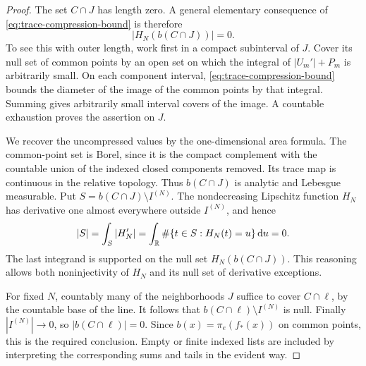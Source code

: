 \begin{proof}
The set $C\cap J$ has length zero.  A general elementary consequence
of \eqref{eq:trace-compression-bound} is therefore
\[
 |H_N(b(C\cap J))|=0.
\]
To see this with outer length, work first in a compact subinterval
of $J$.  Cover its null set of common points by an open set on which
the integral of $|U_m'|+P_m$ is arbitrarily small.  On each component
interval, \eqref{eq:trace-compression-bound} bounds the diameter of
the image of the common points by that integral.  Summing gives
arbitrarily small interval covers of the image.  A countable
exhaustion proves the assertion on $J$.

We recover the uncompressed values by the one-dimensional area
formula.  The common-point set is Borel, since it is the compact
complement with the countable union of the indexed closed components
removed.  Its trace map is continuous in the relative topology.
Thus $b(C\cap J)$ is analytic and Lebesgue measurable.  Put
$S=b(C\cap J)\setminus I^{(N)}$.  The nondecreasing Lipschitz
function $H_N$ has derivative one almost everywhere outside
$I^{(N)}$, and hence
\[
 |S|=\int_S|H_N'|
 =\int_\mathbb R\#\{t\in S:H_N(t)=u\}\,\mathrm d u=0.
\]
The last integrand is supported on the null set
$H_N(b(C\cap J))$.  This reasoning allows both noninjectivity of
$H_N$ and its null set of derivative exceptions.

For fixed $N$, countably many of the neighborhoods $J$ suffice to
cover $C\cap\ell$, by the countable base of the line.  It follows
that $b(C\cap\ell)\setminus I^{(N)}$ is null.  Finally
$|I^{(N)}|\to0$, so $|b(C\cap\ell)|=0$.  Since $b(x)=\pi_e(f_*(x))$
on common points, this is the required conclusion.  Empty or finite
indexed lists are included by interpreting the corresponding sums
and tails in the evident way.
\end{proof}
